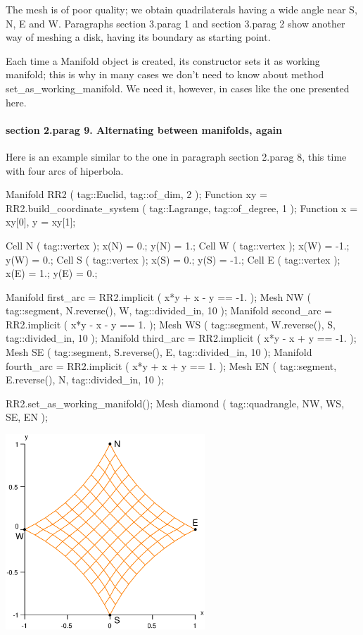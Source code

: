 The mesh is of poor quality; we obtain quadrilaterals having a wide angle near {\codett S},
{\codett N}, {\codett E} and {\codett W}.
Paragraphs \numb section 3.\numb parag 1 and \numb section 3.\numb parag 2 show another way
of meshing a disk, having its boundary as starting point.

Each time a {\codett Manifold} object is created, its constructor sets it as working manifold;
this is why in many cases we don't need to know about method {\codett set\_as\_working\_manifold}.
We need it, however, in cases like the one presented here.
\vfil\eject


\paragraph{\numb section 2.\numb parag 9. Alternating between manifolds, again}

Here is an example similar to the one in paragraph \numb section 2.\numb parag 8,
this time with four arcs of hiperbola.

\verbatim
   Manifold RR2 ( tag::Euclid, tag::of_dim, 2 );
   Function xy = RR2.build_coordinate_system ( tag::Lagrange, tag::of_degree, 1 );
   Function x = xy[0],  y = xy[1];

   Cell N ( tag::vertex );  x(N) =  0.;   y(N) =  1.;
   Cell W ( tag::vertex );  x(W) = -1.;   y(W) =  0.;
   Cell S ( tag::vertex );  x(S) =  0.;   y(S) = -1.;
   Cell E ( tag::vertex );  x(E) =  1.;   y(E) =  0.;

   Manifold first_arc  = RR2.implicit ( x*y + x - y == -1. );
   Mesh NW ( tag::segment, N.reverse(), W, tag::divided_in, 10 );
   Manifold second_arc = RR2.implicit ( x*y - x - y ==  1. );
   Mesh WS ( tag::segment, W.reverse(), S, tag::divided_in, 10 );
   Manifold third_arc  = RR2.implicit ( x*y - x + y == -1. );
   Mesh SE ( tag::segment, S.reverse(), E, tag::divided_in, 10 );
   Manifold fourth_arc = RR2.implicit ( x*y + x + y ==  1. );
   Mesh EN ( tag::segment, E.reverse(), N, tag::divided_in, 10 );
   
   RR2.set_as_working_manifold();
   Mesh diamond ( tag::quadrangle, NW, WS, SE, EN );
\endverbatim

{ 
\centerline{\includegraphics[width=75mm]{diamond.eps}} }

